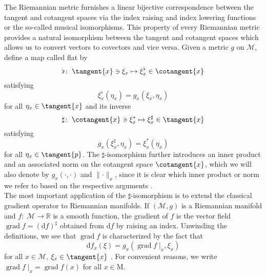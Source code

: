 The Riemannian metric furnishes a linear bijective correspondence between the tangent and cotangent spaces via the index raising and index lowering functions or the so-called musical isomorphisms. This property of every Riemannian metric provides a natural isomorphism between the tangent and cotangent spaces which allows us to convert vectors to covectors and vice versa. Given a metric $g$ on $\mathcal{M}$, define a map called flat by
\begin{equation}\label{MusicallyIsomorphism}
    \flat \colon \; \tangent{x} \ni \xi_x \mapsto \xi^{\flat}_x \in \cotangent{x}
\end{equation}
satisfying
\begin{equation*}
    \xi^{\flat}_x(\eta_x) = g_x(\xi_x,\eta_x)
\end{equation*}
for all $\eta_x \in \tangent{x}$ and its inverse
\begin{equation*}
    \sharp \colon \; \cotangent{x} \ni \xi^{*}_x \mapsto \xi^{\sharp}_x \in \tangent{x}
\end{equation*}
satisfying
\begin{equation*}
    g_x(\xi^{\sharp}_x,\eta_x) = \xi^{*}_x(\eta_x) 
\end{equation*}
for all $\eta_x \in \tangent{p}$. The $\sharp$-isomorphism further introduces an inner product and an associated norm on the cotangent space $\cotangent{x}$, which we will also denote by $g_x(\cdot, \cdot)$ and $\lVert \cdot \rVert_x$, since it is clear which inner product or norm we refer to based on the respective arguments \cite[p.~6]{BergmannHerzogLouzeiroSilvaTenbrinckVidalNunez:2020:1}. \\
The most important application of the $\sharp$-isomorphism is to extend the classical gradient operator to Riemannian manifolds. If $(\mathcal{M}, g)$ is a Riemannian manifold and $f \colon \; \mathcal{M} \to \mathbb{R}$ is a smooth function, the gradient of $f$ is the vector field $\operatorname{grad} f = (\mathrm{d} f)^{\sharp}$ obtained from $\mathrm{d} f$ by raising an index. Unwinding the definitions, we see that $\operatorname{grad} f$ is characterized by the fact that
\begin{equation*}
    \mathrm{d} f_x (\xi) = g_x(\operatorname{grad} f \; \vert_x, \xi_x)
\end{equation*}
for all $x \in \mathcal{M}$, $\xi_x \in \tangent{x}$ \cite[p.~26-27]{Lee:2019}. For convenient reasons, we write $\operatorname{grad} f \; \vert_x = \operatorname{grad} f(x)$ for all $x \in \mathrm{M}$. \\


